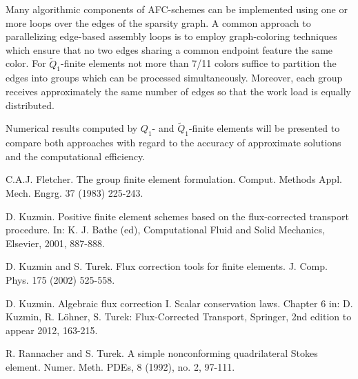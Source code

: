 Many algorithmic components of AFC-schemes \cite{Kuzmin2002,Kuzmin2012} can be implemented using one or more loops over the edges of the sparsity graph. A common approach to parallelizing edge-based assembly loops is to employ graph-coloring techniques which ensure that no two edges sharing a common endpoint feature the same color. For $\tilde Q_1$-finite elements not more than 7/11 colors suffice to partition the edges into groups which can be processed simultaneously. Moreover, each group receives approximately the same number of edges so that the work load is equally distributed.

Numerical results computed by $Q_1$- and $\tilde Q_1$-finite elements will be presented to compare both approaches with regard to the accuracy of approximate solutions and the computational efficiency.


\begin{thebibliography}{10}

{\sc C.A.J. Fletcher}. {The group finite element formulation}. Comput. Methods Appl. Mech. Engrg. 37 (1983) 225-243.



{\sc D. Kuzmin}. {Positive finite element schemes based on the flux-corrected transport procedure}. In: K. J. Bathe (ed), Computational Fluid and Solid Mechanics, Elsevier, 2001, 887-888.



{\sc D. Kuzmin and S. Turek}. {Flux correction tools for finite elements}. J. Comp. Phys. 175 (2002) 525-558.



{\sc D. Kuzmin}. {Algebraic flux correction I. Scalar conservation laws}. Chapter 6 in: D. Kuzmin, R. L\"ohner, S. Turek: Flux-Corrected Transport, Springer, 2nd edition to appear 2012, 163-215.



{\sc R. Rannacher and S. Turek}. {A simple nonconforming quadrilateral Stokes element}. Numer. Meth. PDEs, 8 (1992), no. 2, 97-111.

\end{thebibliography}

